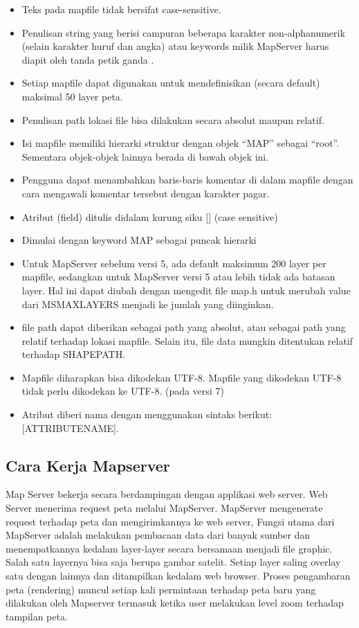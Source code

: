 		\begin{itemize}
			\item Teks pada mapfile tidak bersifat case-sensitive.
			\item Penulisan string yang berisi campuran beberapa karakter non-alphanumerik (selain karakter huruf dan angka) atau keywords milik MapServer harus diapit oleh tanda petik ganda .
			\item Setiap mapfile dapat digunakan untuk mendefinisikan (secara default) maksimal 50 layer peta.
			\item Penulisan path lokasi file bisa dilakukan secara absolut maupun relatif.
			\item Isi mapfile memiliki hierarki struktur dengan objek “MAP” sebagai “root”. Sementara objek-objek lainnya berada di bawah objek ini.
			\item Pengguna dapat menambahkan baris-baris komentar di dalam mapfile dengan cara mengawali komentar tersebut dengan karakter pagar.
			\item Atribut (field) ditulis didalam kurung siku [] (case sensitive)
			\item Dimulai dengan keyword MAP sebagai puncak hierarki
			\item Untuk MapServer sebelum versi 5, ada default maksimum 200 layer per mapfile, 
	      			sedangkan untuk MapServer versi 5 atau lebih tidak ada batasan layer. 
              			Hal ini dapat diubah dengan mengedit file map.h untuk merubah value dari MSMAXLAYERS menjadi ke jumlah yang diinginkan.
			\item file path dapat diberikan sebagai path yang absolut, atau sebagai path yang relatif terhadap lokasi mapfile. Selain itu, file data mungkin ditentukan relatif terhadap SHAPEPATH.
			\item Mapfile diharapkan bisa dikodekan UTF-8. Mapfile yang dikodekan UTF-8 tidak perlu dikodekan ke UTF-8. (pada versi 7)
			\item Atribut diberi nama dengan menggunakan sintaks berikut: [ATTRIBUTENAME].			  
		\end{itemize}

\subsection{Cara Kerja Mapserver}
Map Server bekerja secara berdampingan dengan applikasi web server. Web Server menerima request peta melalui MapServer. 
MapServer mengenerate request terhadap peta dan mengirimkannya ke web server,
Fungsi utama dari MapServer adalah melakukan pembacaan data dari banyak sumber dan menempatkannya kedalam layer-layer secara bersamaan menjadi file graphic.
Salah satu layernya bisa saja berupa gambar satelit. Setiap layer saling overlay satu dengan lainnya dan ditampilkan kedalam web browser.
Proses pengambaran peta (rendering) muncul setiap kali permintaan terhadap peta baru yang dilakukan oleh Mapserver termasuk ketika user melakukan level zoom terhadap tampilan peta.


